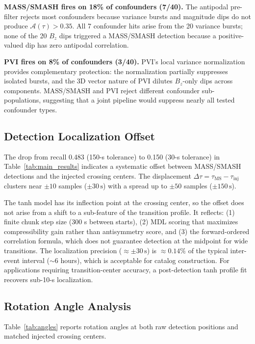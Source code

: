 \documentclass[12pt,letterpaper]{article}
\newcommand{\secunit}{\,\mathrm{s}}
\begin{document}
\textbf{MASS/SMASH fires on 18\% of confounders (7/40).}
The antipodal pre-filter rejects most confounders because variance bursts and
magnitude dips do not produce $\mathcal{A}(\tau) > 0.35$.
All 7 confounder hits arise from the 20 variance bursts; none of the 20
$B_z$ dips triggered a MASS/SMASH detection because a positive-valued dip
has zero antipodal correlation.

\textbf{PVI fires on 8\% of confounders (3/40).}
PVI's local variance normalization provides complementary protection:
the normalization partially suppresses isolated bursts, and the 3D vector
nature of PVI dilutes $B_z$-only dips across components.
MASS/SMASH and PVI reject different confounder sub-populations, suggesting
that a joint pipeline would suppress nearly all tested confounder types.

\subsection{Detection Localization Offset}
\label{subsec:offset}

The drop from recall 0.483 (150-s tolerance) to 0.150 (30-s tolerance) in
Table~\ref{tab:main_results} indicates a systematic offset between MASS/SMASH
detections and the injected crossing centers.
The displacement $\Delta\tau = \tau_\mathrm{MS} - \tau_\mathrm{inj}$ clusters
near $\pm 10$ samples ($\pm 30\secunit$) with a spread up to $\pm 50$ samples
($\pm 150\secunit$).

The tanh model has its inflection point at the crossing center, so the offset
does not arise from a shift to a sub-feature of the transition profile.
It reflects: (1) finite chunk step size (300 s between starts),
(2) MDL scoring that maximizes compressibility gain rather than antisymmetry
score, and (3) the forward-ordered correlation formula, which does not
guarantee detection at the midpoint for wide transitions.
The localization precision ($\approx \pm 30\secunit$) is $\approx 0.14\%$ of
the typical inter-event interval ($\sim$6 hours), which is acceptable for
catalog construction.
For applications requiring transition-center accuracy, a post-detection
tanh profile fit recovers sub-10-s localization.

\subsection{Rotation Angle Analysis}
\label{subsec:angles}

Table~\ref{tab:angles} reports rotation angles at both raw detection positions
and matched injected crossing centers.
\end{document}
